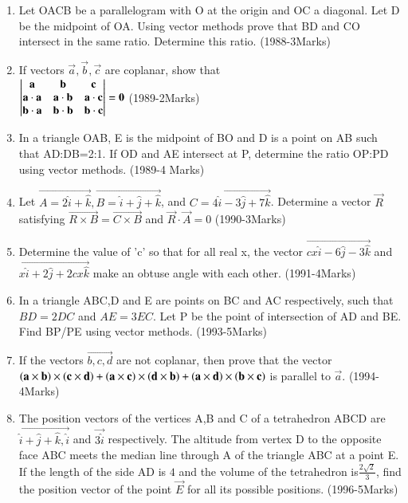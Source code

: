 \documentclass[journal,12pt,twocolumn]{IEEEtran}
\theoremstyle{remark}
\begin{document}
\begin{enumerate}
\item Let OACB be a parallelogram with O at the origin and OC a diagonal. Let D be the midpoint of OA. Using vector methods prove that BD and CO intersect in the same ratio. Determine this ratio. \hfill{(1988-3Marks)}\\ 

\item If vectors $\vec{a},\vec{b},\vec{c}$ are coplanar, show that\\
	$
		\begin{vmatrix}
\mathbf{a} & \mathbf{b} & \mathbf{c} \\
\mathbf{a}\cdot\mathbf{a} & \mathbf{a}\cdot\mathbf{b} & \mathbf{a}\cdot\mathbf{c} \\
\mathbf{b}\cdot\mathbf{a} & \mathbf{b}\cdot\mathbf{b} & \mathbf{b}\cdot\mathbf{c}
 \end{vmatrix}=\mathbf{0}
$ \hfill{(1989-2Marks)}\\

\item In a triangle OAB, E is the midpoint of BO and D is a point on AB such that AD:DB=2:1. If OD and AE intersect at P, determine the ratio OP:PD  using vector methods. \hfill{(1989-4 Marks)}\\

\item Let $\vec{A=2\hat{i}+\hat{k}},\vec{B=\hat{i}+\hat{j}+\hat{k}}$, and $\vec{C=4\hat{i}-3\hat{j}+7\hat{k}}$. Determine a vector $\vec{R}$ satisfying $\vec{R\times B}=\vec{C\times B}$ and $\vec{R}\cdot\vec{A}=0$ \hfill{(1990-3Marks)}\\

\item Determine the value of 'c' so that for all real x, the vector $\vec{cx\hat{i}-6\hat{j}-3\hat{k}}$ and $\vec{x\hat{i}+2\hat{j}+2cx\hat{k}}$ make an obtuse angle with each other. \hfill{(1991-4Marks)}\\

\item In a triangle ABC,D and E are points on BC and AC respectively, such that $BD=2DC$ and $AE=3EC$. Let P be the point of intersection of AD and BE. Find BP/PE using vector methods. \hfill{(1993-5Marks)}\\

\item If the vectors $\vec{b,c,d}$ are not coplanar, then prove that the vector $\mathbf{\left(a\times b\right)\times\left(c\times d\right)}+\mathbf{\left(a\times c\right)\times\left(d\times b\right)}+\mathbf{\left(a\times d\right)\times\left(b\times c\right)}$ is parallel to $\vec{a}$. \hfill{(1994-4Marks)}\\

\item The position vectors of the vertices A,B and C of a tetrahedron ABCD are $\vec{\hat{i}+\hat{j}+\hat{k},\hat{i}}$ and $\vec{3\hat{i}}$ respectively. The altitude from vertex D to the opposite face ABC meets the median line through A of the triangle ABC at a point E. If the length of the side AD is $4$ and the volume of the tetrahedron is$\frac{2\sqrt{2}}{3}$, find the position vector of the point $\vec{E}$ for all its possible positions. \hfill{(1996-5Marks)}


\end{enumerate}
\end{document}
